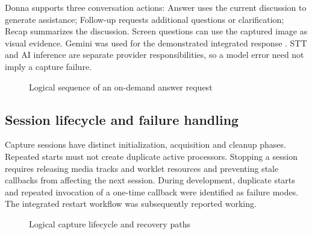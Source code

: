 \documentclass[openany]{tietreport}
\begin{document}
Donna supports three conversation actions: Answer uses the current discussion to generate assistance; Follow-up requests additional questions or clarification; Recap summarizes the discussion. Screen questions can use the captured image as visual evidence. Gemini was used for the demonstrated integrated response \cite{gemini}. STT and AI inference are separate provider responsibilities, so a model error need not imply a capture failure.
\begin{figure}[htbp]\centering
{}\caption{Logical sequence of an on-demand answer request}\end{figure}
\subsection{Session lifecycle and failure handling}
Capture sessions have distinct initialization, acquisition and cleanup phases. Repeated starts must not create duplicate active processors. Stopping a session requires releasing media tracks and worklet resources and preventing stale callbacks from affecting the next session. During development, duplicate starts and repeated invocation of a one-time callback were identified as failure modes. The integrated restart workflow was subsequently reported working.
\begin{figure}[htbp]\centering
{}\caption{Logical capture lifecycle and recovery paths}\end{figure}
\end{document}
